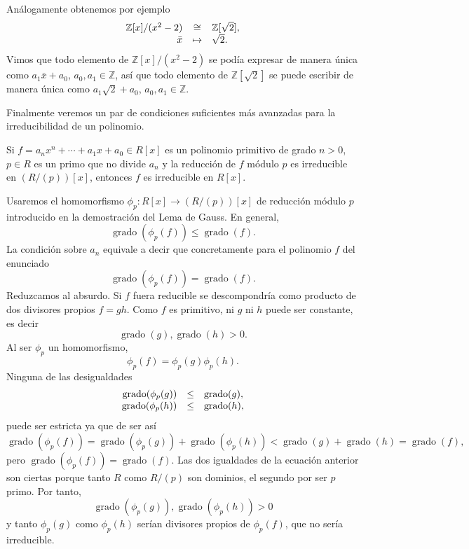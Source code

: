 Análogamente obtenemos por ejemplo \[
\begin{array}{rcl}
\mathbb Z[x]/(x^2-2)&\cong&\mathbb Z[\sqrt{2}],\cr
 \bar{x}&\mapsto& \sqrt{2}.
\end{array}
\] Vimos que todo elemento de \(\mathbb Z[x]/(x^2-2)\) se podía expresar
de manera única como \(a_1\bar x+a_0\), \(a_0,a_1\in\mathbb Z\), así
que todo elemento de \(\mathbb Z[\sqrt{2}]\) se puede escribir de manera
única como \(a_1 \sqrt{2}+a_0\), \(a_0,a_1\in\mathbb Z\).

Finalmente veremos un par de condiciones suficientes más avanzadas para
la irreducibilidad de un polinomio.


Si \(f=a_nx^n+\cdots+a_1x+a_0\in R[x]\) es un polinomio primitivo de
grado \(n>0\), \(p\in R\) es un primo que no divide \(a_n\) y la
reducción de \(f\) módulo \(p\) es irreducible en \((R/(p))[x]\),
entonces \(f\) es irreducible en \(R[x]\). 


Usaremos el homomorfismo \(\phi_p\colon R[x]\rightarrow (R/(p))[x]\) de
reducción módulo \(p\) introducido en la demostración del Lema de Gauss.
En general,
\[\operatorname{grado}(\phi_p(f))\leq \operatorname{grado}(f).\] La
condición sobre \(a_n\) equivale a decir que concretamente para el
polinomio \(f\) del enunciado
\[\operatorname{grado}(\phi_p(f))= \operatorname{grado}(f).\] Reduzcamos
al absurdo. Si \(f\) fuera reducible se descompondría como producto de
dos divisores propios \(f=gh\). Como \(f\) es primitivo, ni \(g\) ni
\(h\) puede ser constante, es decir
\[\operatorname{grado}(g),\operatorname{grado}(h)>0.\] Al ser \(\phi_p\)
un homomorfismo, \[\phi_p(f)=\phi_p(g)\phi_p(h).\] Ninguna de las
desigualdades
\[\begin{array}{rcl} \operatorname{grado}(\phi_p(g))&\leq &\operatorname{grado}(g),\cr \operatorname{grado}(\phi_p(h))&\leq &\operatorname{grado}(h), \end{array}\]
puede ser estricta ya que de ser así
\[\operatorname{grado}(\phi_p(f))=\operatorname{grado}(\phi_p(g))+\operatorname{grado}(\phi_p(h))<\operatorname{grado}(g)+\operatorname{grado}(h)=\operatorname{grado}(f),\]
pero \(\operatorname{grado}(\phi_p(f))=\operatorname{grado}(f)\). Las
dos igualdades de la ecuación anterior son ciertas porque tanto \(R\)
como \(R/(p)\) son dominios, el segundo por ser \(p\) primo. Por tanto,
\[\operatorname{grado}(\phi_p(g)),\operatorname{grado}(\phi_p(h))>0\] y
tanto \(\phi_p(g)\) como \(\phi_p(h)\) serían divisores propios de
\(\phi_p(f)\), que no sería irreducible. 

